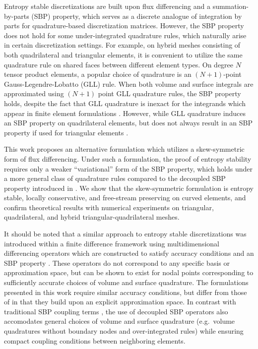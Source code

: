 \documentclass[review]{siamart0216}
\theoremstyle{assumption}
\begin{document}
Entropy stable discretizations are built upon flux differencing and a summation-by-parts (SBP) property, which serves as a discrete analogue of integration by parts for quadrature-based discretization matrices.  However, the SBP property does not hold for some under-integrated quadrature rules, which naturally arise in certain discretization settings.  For example, on hybrid meshes consisting of both quadrilateral and triangular elements, it is convenient to utilize the same quadrature rule on shared faces between different element types.  On degree $N$ tensor product elements, a popular choice of quadrature is an $(N+1)$-point Gauss-Legendre-Lobatto (GLL) rule.  When both volume and surface integrals are approximated using $(N+1)$ point GLL quadrature rules, the SBP property holds, despite the fact that GLL quadrature is inexact for the integrands which appear in finite element formulations \cite{fisher2013high}.  However, while GLL quadrature induces an SBP property on quadrilateral elements, but does not always result in an SBP property if used for triangular elements \cite{chan2017discretely}.  %

This work proposes an alternative formulation which utilizes a skew-symmetric form of flux differencing.  Under such a formulation, the proof of entropy stability requires only a weaker ``variational'' form of the SBP property, which holds under a more general class of quadrature rules compared to the decoupled SBP property introduced in \cite{chan2017discretely, chan2018discretely}.  We show that the skew-symmetric formulation is entropy stable, locally conservative, and free-stream preserving on curved elements, and confirm theoretical results with numerical experiments on triangular, quadrilateral, and hybrid triangular-quadrilateral meshes.  

It should be noted that a similar approach to entropy stable discretizations was introduced within a finite difference framework \cite{chen2017entropy, crean2018entropy} using multidimensional differencing operators which are constructed to satisfy accuracy conditions and an SBP property \cite{hicken2016multidimensional}.  These operators do not correspond to any specific basis or approximation space, but can be shown to exist for nodal points corresponding to sufficiently accurate choices of volume and surface quadrature.  The formulations presented in this work require similar accuracy conditions, but differ from those of \cite{chen2017entropy, crean2018entropy} in that they build upon an explicit approximation space.  In contrast with traditional SBP coupling terms \cite{crean2017high}, the use of decoupled SBP operators also accomodates general choices of volume and surface quadrature (e.g.\ volume quadratures without boundary nodes and over-integrated rules) while ensuring compact coupling conditions between neighboring elements.  
\end{document}
